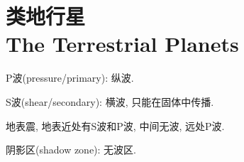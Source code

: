 \chapter{类地行星\\The Terrestrial Planets}

P波(pressure/primary): 纵波.

S波(shear/secondary): 横波, 只能在固体中传播.

地表震, 地表近处有S波和P波, 中间无波, 远处P波.

阴影区(shadow zone): 无波区.
